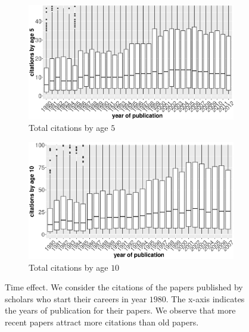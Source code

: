\begin{refsection}
\begin{figure}[h!]
     \centering
     \begin{subfigure}[b]{0.48\textwidth}
         \centering
         \includegraphics[width=\textwidth]{figures/exploratory/environment_age5.eps}
         \caption{Total citations by age $5$}
     \end{subfigure}
     \hfill
     \begin{subfigure}[b]{0.48\textwidth}
         \centering
         \includegraphics[width=\textwidth]{figures/exploratory/environment_age10.eps}
         \caption{Total citations by age $10$}
     \end{subfigure}
    \caption{Time effect. We consider the citations of the papers published by scholars who start their careers in year $1980$. The x-axis indicates the years of publication for their papers. We observe that more recent papers attract more citations than old papers.}
    \label{fig:environment}
\end{figure}


\end{refsection}
